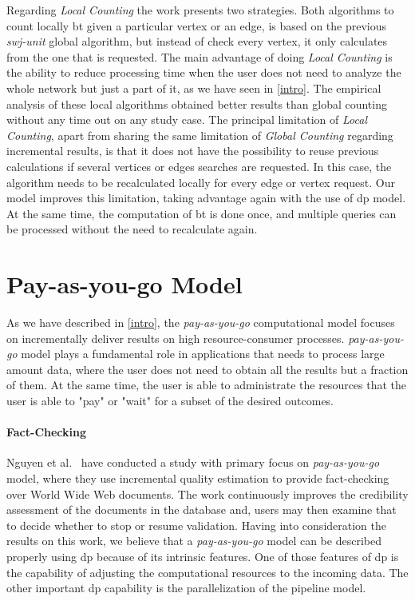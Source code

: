 Regarding \emph{Local Counting} the work presents two strategies. 
Both algorithms to count locally \acrshort{bt} given a particular vertex or an edge, is based on the previous \emph{swj-unit} global algorithm, but instead of check every vertex, it only calculates from the one that is requested. 
The main advantage of doing \emph{Local Counting} is the ability to reduce processing time when the user does not need to analyze the whole network but just a part of it, as we have seen in \autoref{intro}.
The empirical analysis of these local algorithms obtained better results than global counting without any time out on any study case.
The principal limitation of \emph{Local Counting}, apart from sharing the same limitation of \emph{Global Counting} regarding incremental results, is that it does not have the possibility to reuse previous calculations if several vertices or edges searches are requested. 
In this case, the algorithm needs to be recalculated locally for every edge or vertex request.
Our model improves this limitation, taking advantage again with the use of \acrshort{dp} model. At the same time, the computation of \acrshort{bt} is done once, and multiple queries can be processed without the need to recalculate again.

\section{Pay-as-you-go Model}
As we have described in \autoref{intro}, the \emph{pay-as-you-go} computational model focuses on incrementally deliver results on high resource-consumer processes.
\emph{pay-as-you-go} model plays a fundamental role in applications that needs to process large amount data, where the user does not need to obtain all the results but a fraction of them.
At the same time, the user is able to administrate the resources that the user is able to "pay" or "wait" for a subset of the desired outcomes. 

\paragraph{Fact-Checking} Nguyen et al.~\cite{factcatch} have conducted a study with primary focus on \emph{pay-as-you-go} model, where they use incremental quality estimation to provide fact-checking over World Wide Web documents.
The work continuously improves the credibility assessment of the documents in the database and, users may then examine that to decide whether to stop or resume validation.
Having into consideration the results on this work, we believe that a \emph{pay-as-you-go} model can be described properly using \acrlong{dp} because of its intrinsic features. 
One of those features of \acrshort{dp} is the capability of adjusting the computational resources to the incoming data. The other important \acrshort{dp} capability is the parallelization of the pipeline model.

